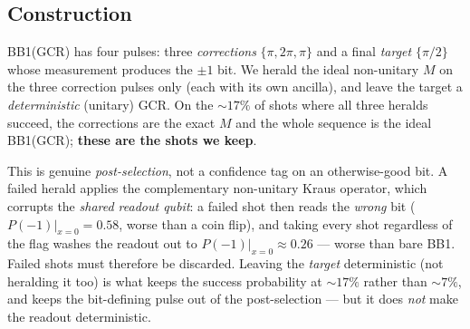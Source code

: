 \documentclass[11pt]{article}
\begin{document}
\subsection{Construction}
BB1(GCR) has four pulses: three \emph{corrections} $\{\pi,2\pi,\pi\}$ and a final \emph{target}
$\{\pi/2\}$ whose measurement produces the $\pm1$ bit. We herald the ideal non-unitary $M$ on the
three correction pulses only (each with its own ancilla), and leave the target a \emph{deterministic}
(unitary) GCR. On the $\sim17\%$ of shots where all three heralds succeed, the corrections are the
exact $M$ and the whole sequence is the ideal BB1(GCR); \textbf{these are the shots we keep}.

This is genuine \emph{post-selection}, not a confidence tag on an otherwise-good bit. A failed herald
applies the complementary non-unitary Kraus operator, which corrupts the \emph{shared readout qubit}:
a failed shot then reads the \emph{wrong} bit ($P(-1)|_{x=0}=0.58$, worse than a coin flip), and
taking every shot regardless of the flag washes the readout out to $P(-1)|_{x=0}\approx0.26$ --- worse
than bare BB1. Failed shots must therefore be discarded. Leaving the \emph{target} deterministic (not
heralding it too) is what keeps the success probability at $\sim17\%$ rather than $\sim7\%$, and keeps
the bit-defining pulse out of the post-selection --- but it does \emph{not} make the readout
deterministic.
\end{document}
